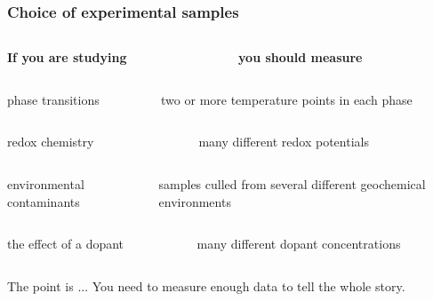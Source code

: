 \documentclass[10pt, xcolor=x11names, compress]{beamer}
\begin{document}
\begin{frame}
  \frametitle{Choice of experimental samples}
  \begin{columns}
    \begin{column}{0.4\linewidth}
      {\color{ExampleGreen}\textbf{If you are studying}}
    \end{column}
    \begin{column}{0.6\linewidth}
      {\color{ExampleGreen}\textbf{you should measure}}
    \end{column}
  \end{columns}

  \bigskip

  \begin{columns}
    \begin{column}{0.4\linewidth}
      phase transitions
    \end{column}
    \begin{column}{0.6\linewidth}
       two or more temperature points in each phase
    \end{column}
  \end{columns}

  \bigskip

  \begin{columns}
    \begin{column}{0.4\linewidth}
    redox chemistry
    \end{column}
    \begin{column}{0.6\linewidth}
      many different redox potentials
    \end{column}
  \end{columns}

  \bigskip

  \begin{columns}
    \begin{column}{0.4\linewidth}
      environmental contaminants
    \end{column}
    \begin{column}{0.6\linewidth}
      samples culled from several different geochemical environments
    \end{column}
  \end{columns}

  \bigskip

  \begin{columns}
    \begin{column}{0.4\linewidth}
      the effect of a dopant
    \end{column}
    \begin{column}{0.6\linewidth}
      many different dopant concentrations
    \end{column}
  \end{columns}

  \bigskip

  \begin{block}{The point is ...}
    You need to measure enough data to tell the whole story.
  \end{block}
\end{frame}
\end{document}
